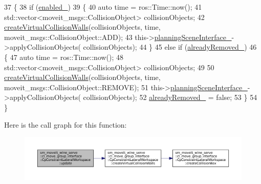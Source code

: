 \begin{DoxyCode}
37         \{
38             \textcolor{keywordflow}{if} (\hyperlink{classsm__moveit__wine__serve_1_1cl__move__group__interface_1_1CpConstraintLateralWorkspace_a98fd9192d4b36e1b416ce7d90536c8de}{enabled\_})
39             \{
40                 \textcolor{keyword}{auto} time = ros::Time::now();
41                 std::vector<moveit\_msgs::CollisionObject> collisionObjects;
42                 \hyperlink{classsm__moveit__wine__serve_1_1cl__move__group__interface_1_1CpConstraintLateralWorkspace_aeedef6f788c390a37d6b74d90873f547}{createVirtualCollisionWalls}(collisionObjects, time, 
      moveit\_msgs::CollisionObject::ADD);
43                 this->\hyperlink{classsm__moveit__wine__serve_1_1cl__move__group__interface_1_1CpConstraintLateralWorkspace_a28bd199cdd66872426a278dd8847f780}{planningSceneInterface\_}->applyCollisionObjects(
      collisionObjects);
44             \}
45             \textcolor{keywordflow}{else} \textcolor{keywordflow}{if} (\hyperlink{classsm__moveit__wine__serve_1_1cl__move__group__interface_1_1CpConstraintLateralWorkspace_aa48cf2bb345e79ba15e0f221f26f7df5}{alreadyRemoved\_})
46             \{
47                 \textcolor{keyword}{auto} time = ros::Time::now();
48                 std::vector<moveit\_msgs::CollisionObject> collisionObjects;
49 
50                 \hyperlink{classsm__moveit__wine__serve_1_1cl__move__group__interface_1_1CpConstraintLateralWorkspace_aeedef6f788c390a37d6b74d90873f547}{createVirtualCollisionWalls}(collisionObjects, time, 
      moveit\_msgs::CollisionObject::REMOVE);
51                 this->\hyperlink{classsm__moveit__wine__serve_1_1cl__move__group__interface_1_1CpConstraintLateralWorkspace_a28bd199cdd66872426a278dd8847f780}{planningSceneInterface\_}->applyCollisionObjects(
      collisionObjects);
52                 \hyperlink{classsm__moveit__wine__serve_1_1cl__move__group__interface_1_1CpConstraintLateralWorkspace_aa48cf2bb345e79ba15e0f221f26f7df5}{alreadyRemoved\_} = \textcolor{keyword}{false};
53             \}
54         \}
\end{DoxyCode}
Here is the call graph for this function\+:
\nopagebreak
\begin{figure}[H]
\begin{center}
\leavevmode
\includegraphics[width=350pt]{classsm__moveit__wine__serve_1_1cl__move__group__interface_1_1CpConstraintLateralWorkspace_a76692ba49429efb9e704cd8fdcf6ec0b_cgraph}
\end{center}
\end{figure}
